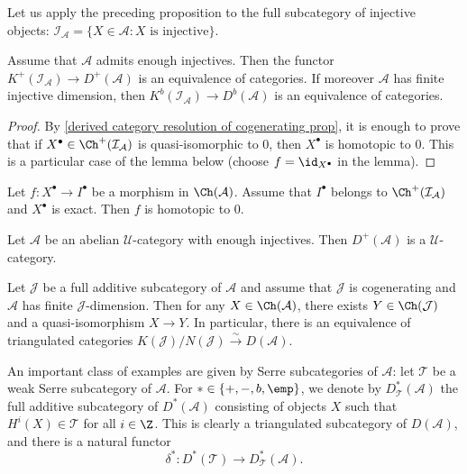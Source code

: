Let us apply the preceding proposition to the full subcategory of injective objects: $\mathcal{I}_\mathcal{A}=\{X\in\mathcal{A}:\text{$X$ is injective}\}$.
\begin{proposition}\label{derived category enough injective equivalence}
Assume that $\mathcal{A}$ admits enough injectives. Then the functor $K^+(\mathcal{I}_\mathcal{A})\to D^+(\mathcal{A})$ is an equivalence of categories. If moreover $\mathcal{A}$ has finite injective dimension, then $K^b(\mathcal{I}_\mathcal{A})\to D^b(\mathcal{A})$ is an equivalence of categories.
\end{proposition}
\begin{proof}
By \cref{derived category resolution of cogenerating prop}, it is enough to prove that if $X^\bullet\in\Ch^+(\mathcal{I}_\mathcal{A})$ is quasi-isomorphic to $0$, then $X^\bullet$ is homotopic to $0$. This is a particular case of the lemma below (choose $f=\id_{X^\bullet}$ in the lemma).
\end{proof}

\begin{lemma}\label{abelian cat injective qis zero is null-homotopy}
Let $f:X^\bullet\to I^\bullet$ be a morphism in $\Ch(\mathcal{A})$. Assume that $I^\bullet$ belongs to $\Ch^+(\mathcal{I}_\mathcal{A})$ and $X^\bullet$ is exact. Then $f$ is homotopic to $0$.
\end{lemma}


\begin{corollary}\label{derived category enough injective U-cat}
Let $\mathcal{A}$ be an abelian $\mathscr{U}$-category with enough injectives. Then $D^+(\mathcal{A})$ is a $\mathscr{U}$-category.
\end{corollary}

\begin{proposition}
Let $\mathcal{J}$ be a full additive subcategory of $\mathcal{A}$ and assume that $\mathcal{J}$ is cogenerating and $\mathcal{A}$ has finite $\mathcal{J}$-dimension. Then for any $X\in\Ch(\mathcal{A})$, there exists $Y\in\Ch(\mathcal{J})$ and a quasi-isomorphism $X\to Y$. In particular, there is an equivalence of triangulated categories $K(\mathcal{J})/N(\mathcal{J})\stackrel{\sim}{\to} D(\mathcal{A})$.
\end{proposition}

An important class of examples are given by Serre subcategories of $\mathcal{A}$: let $\mathcal{T}$ be a weak Serre subcategory of $\mathcal{A}$. For $*\in\{+,-,b,\emp\}$, we denote by $D^*_\mathcal{T}(\mathcal{A})$ the full additive subcategory of $D^*(\mathcal{A})$ consisting of objects $X$ such that $H^i(X)\in\mathcal{T}$ for all $i\in\Z$. This is clearly a triangulated subcategory of $D(\mathcal{A})$, and there is a natural functor
\begin{equation}\label{derived category truncation by Serre subcat prop-1}
\delta^*:D^*(\mathcal{T})\to D^*_\mathcal{T}(\mathcal{A}).
\end{equation}

